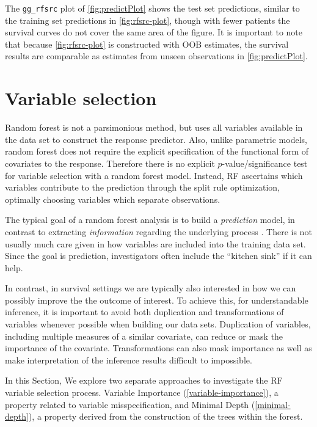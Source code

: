 \documentclass[article]{jss}
\begin{document}
The \texttt{gg\_rfsrc} plot of \autoref{fig:predictPlot} shows the test
set predictions, similar to the training set predictions in
\autoref{fig:rfsrc-plot}, though with fewer patients the survival curves
do not cover the same area of the figure. It is important to note that
because \autoref{fig:rfsrc-plot} is constructed with OOB estimates, the
survival results are comparable as estimates from unseen observations in
\autoref{fig:predictPlot}.

\section{Variable selection}\label{variable-selection}

Random forest is not a parsimonious method, but uses all variables
available in the data set to construct the response predictor. Also,
unlike parametric models, random forest does not require the explicit
specification of the functional form of covariates to the response.
Therefore there is no explicit \(p\)-value/significance test for
variable selection with a random forest model. Instead, RF ascertains
which variables contribute to the prediction through the split rule
optimization, optimally choosing variables which separate observations.

The typical goal of a random forest analysis is to build a
\emph{prediction} model, in contrast to extracting \emph{information}
regarding the underlying process \citep{Breiman:twoCultures:2001}. There
is not usually much care given in how variables are included into the
training data set. Since the goal is prediction, investigators often
include the ``kitchen sink'' if it can help.

In contrast, in survival settings we are typically also interested in
how we can possibly improve the the outcome of interest. To achieve
this, for understandable inference, it is important to avoid both
duplication and transformations of variables whenever possible when
building our data sets. Duplication of variables, including multiple
measures of a similar covariate, can reduce or mask the importance of
the covariate. Transformations can also mask importance as well as make
interpretation of the inference results difficult to impossible.

In this Section, We explore two separate approaches to investigate the
RF variable selection process. Variable Importance
(\autoref{variable-importance}), a property related to variable
misspecification, and Minimal Depth (\autoref{minimal-depth}), a
property derived from the construction of the trees within the forest.
\end{document}
